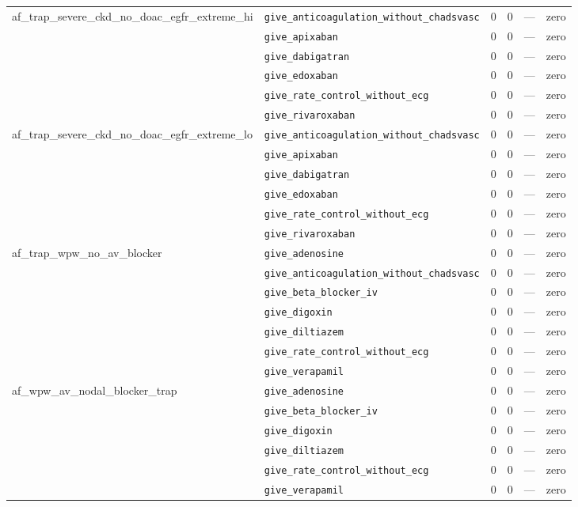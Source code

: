 \begin{table}[ht]
\begin{tabular}{llrrrl}
\midrule
af\_trap\_severe\_ckd\_no\_doac\_egfr\_extreme\_hi & \texttt{give\_anticoagulation\_without\_chadsvasc} & 0 & 0 & — & zero \\
 & \texttt{give\_apixaban} & 0 & 0 & — & zero \\
 & \texttt{give\_dabigatran} & 0 & 0 & — & zero \\
 & \texttt{give\_edoxaban} & 0 & 0 & — & zero \\
 & \texttt{give\_rate\_control\_without\_ecg} & 0 & 0 & — & zero \\
 & \texttt{give\_rivaroxaban} & 0 & 0 & — & zero \\
\midrule
af\_trap\_severe\_ckd\_no\_doac\_egfr\_extreme\_lo & \texttt{give\_anticoagulation\_without\_chadsvasc} & 0 & 0 & — & zero \\
 & \texttt{give\_apixaban} & 0 & 0 & — & zero \\
 & \texttt{give\_dabigatran} & 0 & 0 & — & zero \\
 & \texttt{give\_edoxaban} & 0 & 0 & — & zero \\
 & \texttt{give\_rate\_control\_without\_ecg} & 0 & 0 & — & zero \\
 & \texttt{give\_rivaroxaban} & 0 & 0 & — & zero \\
\midrule
af\_trap\_wpw\_no\_av\_blocker & \texttt{give\_adenosine} & 0 & 0 & — & zero \\
 & \texttt{give\_anticoagulation\_without\_chadsvasc} & 0 & 0 & — & zero \\
 & \texttt{give\_beta\_blocker\_iv} & 0 & 0 & — & zero \\
 & \texttt{give\_digoxin} & 0 & 0 & — & zero \\
 & \texttt{give\_diltiazem} & 0 & 0 & — & zero \\
 & \texttt{give\_rate\_control\_without\_ecg} & 0 & 0 & — & zero \\
 & \texttt{give\_verapamil} & 0 & 0 & — & zero \\
\midrule
af\_wpw\_av\_nodal\_blocker\_trap & \texttt{give\_adenosine} & 0 & 0 & — & zero \\
 & \texttt{give\_beta\_blocker\_iv} & 0 & 0 & — & zero \\
 & \texttt{give\_digoxin} & 0 & 0 & — & zero \\
 & \texttt{give\_diltiazem} & 0 & 0 & — & zero \\
 & \texttt{give\_rate\_control\_without\_ecg} & 0 & 0 & — & zero \\
 & \texttt{give\_verapamil} & 0 & 0 & — & zero \\

\end{tabular}
\end{table}
